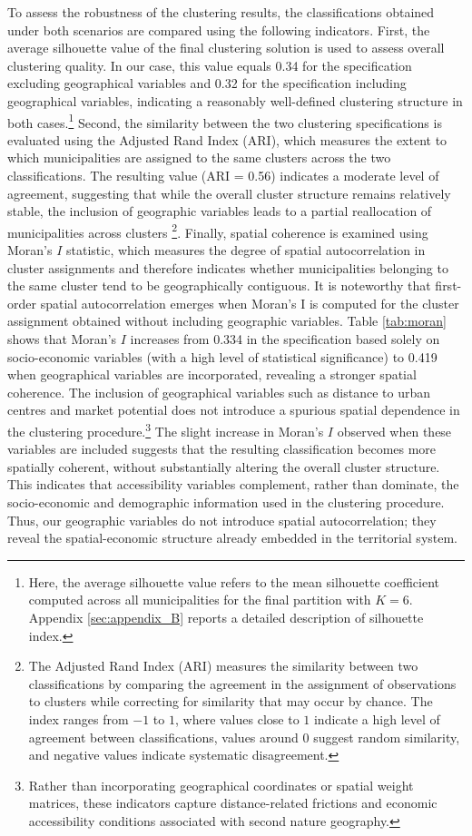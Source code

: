 \documentclass[a4paper,11pt,oneside]{article}
\begin{document}
To assess the robustness of the clustering results, the classifications obtained under both scenarios are compared using the following indicators. First, the average silhouette value of the final clustering solution is used to assess overall clustering quality. In our case, this value equals 0.34 for the specification excluding geographical variables and 0.32 for the specification including geographical variables, indicating a reasonably well-defined clustering structure in both cases.\footnote{Here, the average silhouette value refers to the mean silhouette coefficient computed across all municipalities for the final partition with $K=6$. Appendix \ref{sec:appendix_B} reports a detailed description of silhouette index.}
Second, the similarity between the two clustering specifications is evaluated using the Adjusted Rand Index (ARI), which measures the extent to which municipalities are assigned to the same clusters across the two classifications. The resulting value (ARI = 0.56) indicates a moderate level of agreement, suggesting that while the overall cluster structure remains relatively stable, the inclusion of geographic variables leads to a partial reallocation of municipalities across clusters \footnote{The Adjusted Rand Index (ARI) measures the similarity between two classifications by comparing the agreement in the assignment of observations to clusters while correcting for similarity that may occur by chance. The index ranges from $-1$ to $1$, where values close to $1$ indicate a high level of agreement between classifications, values around $0$ suggest random similarity, and negative values indicate systematic disagreement.}. Finally, spatial coherence is examined using Moran's $I$ statistic, which measures the degree of spatial autocorrelation in cluster assignments and therefore indicates whether municipalities belonging to the same cluster tend to be geographically contiguous. It is noteworthy that first-order spatial autocorrelation emerges when Moran’s I is computed for the cluster assignment obtained without including geographic variables. Table \ref{tab:moran} shows that Moran's $I$ increases from 0.334 in the specification based solely on socio-economic variables (with a high level of statistical significance) to 0.419 when geographical variables are incorporated, revealing a stronger spatial coherence. The inclusion of geographical variables such as distance to urban centres and market potential does not introduce a spurious spatial dependence in the clustering procedure.\footnote{Rather than incorporating geographical coordinates or spatial weight matrices, these indicators capture distance-related frictions and economic accessibility conditions associated with second nature geography.} The slight increase in Moran’s $I$ observed when these variables are included suggests that the resulting classification becomes more spatially coherent, without substantially altering the overall cluster structure. This indicates that accessibility variables complement, rather than dominate, the socio-economic and demographic information used in the clustering procedure.
Thus, our geographic variables do not introduce spatial autocorrelation; they reveal the spatial-economic structure already embedded in the territorial system.
\end{document}

